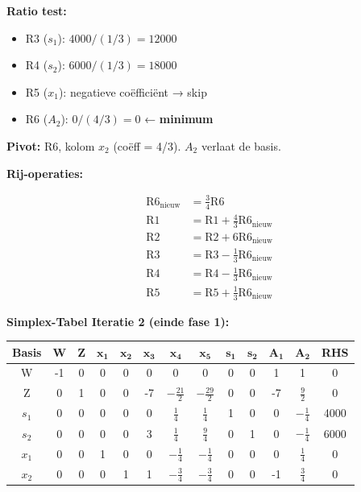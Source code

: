 \documentclass[a4paper,11pt]{article}
\begin{document}
\begin{oefenblok}
    \textbf{Ratio test:}
    \begin{itemize}
        \item R3 ($s_1$): $4000/(1/3) = 12000$
        \item R4 ($s_2$): $6000/(1/3) = 18000$
        \item R5 ($x_1$): negatieve coëfficiënt → skip
        \item R6 ($A_2$): $0/(4/3) = 0$ ← \textbf{minimum}
    \end{itemize}

    \textbf{Pivot:} R6, kolom $x_2$ (coëff = 4/3). $A_2$ verlaat de basis.

    \textbf{Rij-operaties:}

    \begin{align*}
        \text{R6}_{\text{nieuw}} & = \frac{3}{4}\text{R6} \\
        \text{R1} & = \text{R1} + \frac{4}{3}\text{R6}_{\text{nieuw}} \\
        \text{R2} & = \text{R2} + 6\text{R6}_{\text{nieuw}} \\
        \text{R3} & = \text{R3} - \frac{1}{3}\text{R6}_{\text{nieuw}} \\
        \text{R4} & = \text{R4} - \frac{1}{3}\text{R6}_{\text{nieuw}} \\
        \text{R5} & = \text{R5} + \frac{1}{3}\text{R6}_{\text{nieuw}}
    \end{align*}

    \textbf{Simplex-Tabel Iteratie 2 (einde fase 1):}

    \begin{center}
        \footnotesize
        \setlength{\tabcolsep}{3pt}
        \begin{tabular}{|c|c|c|c|c|c|c|c|c|c|c|c|c|}
            \hline
            \textbf{Basis} & \textbf{W} & \textbf{Z} & $\mathbf{x_1}$ & $\mathbf{x_2}$ & $\mathbf{x_3}$ & $\mathbf{x_4}$ & $\mathbf{x_5}$ & $\mathbf{s_1}$ & $\mathbf{s_2}$ & $\mathbf{A_1}$ & $\mathbf{A_2}$ & \textbf{RHS} \\
            \hline
            W & -1 & 0 & 0 & 0 & 0 & 0 & 0 & 0 & 0 & 1 & 1 & 0 \\
            \hline
            Z & 0 & 1 & 0 & 0 & -7 & $-\frac{21}{2}$ & $-\frac{29}{2}$ & 0 & 0 & -7 & $\frac{9}{2}$ & 0 \\
            \hline
            $s_1$ & 0 & 0 & 0 & 0 & 0 & $\frac{1}{4}$ & $\frac{1}{4}$ & 1 & 0 & 0 & $-\frac{1}{4}$ & 4000 \\
            \hline
            $s_2$ & 0 & 0 & 0 & 0 & 3 & $\frac{1}{4}$ & $\frac{9}{4}$ & 0 & 1 & 0 & $-\frac{1}{4}$ & 6000 \\
            \hline
            $x_1$ & 0 & 0 & 1 & 0 & 0 & $-\frac{1}{4}$ & $-\frac{1}{4}$ & 0 & 0 & 0 & $\frac{1}{4}$ & 0 \\
            \hline
            $x_2$ & 0 & 0 & 0 & 1 & 1 & $-\frac{3}{4}$ & $-\frac{3}{4}$ & 0 & 0 & -1 & $\frac{3}{4}$ & 0 \\
            \hline
        \end{tabular}
    \end{center}


\end{oefenblok}
\end{document}
